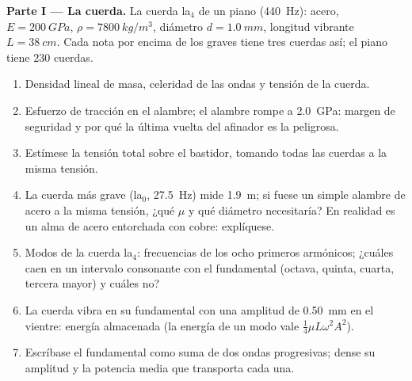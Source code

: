 \begin{problem}
\label{pb:b2:waves-on-strings:1}

\medskip
\noindent\textbf{Parte I --- La cuerda.}
La cuerda la$_4$ de un piano (\qty{440}{Hz}): acero, $E = \qty{200}{GPa}$, $\rho =
\qty{7800}{kg/m^3}$, diámetro $d = \qty{1.0}{mm}$, longitud vibrante $L =
\qty{38}{cm}$. Cada nota por encima de los graves tiene tres cuerdas así; el
piano tiene $230$ cuerdas.
\begin{enumerate}
  \item Densidad lineal de masa, celeridad de las ondas y tensión de la
        cuerda.
  \item Esfuerzo de tracción en el alambre; el alambre rompe a
        \qty{2.0}{GPa}: margen de seguridad y por qué la última vuelta del
        afinador es la peligrosa.
  \item Estímese la tensión total sobre el bastidor, tomando todas las
        cuerdas a la misma tensión.
  \item La cuerda más grave (la$_0$, \qty{27.5}{Hz}) mide \qty{1.9}{m}; si
        fuese un simple alambre de acero a la misma tensión, ¿qué $\mu$ y
        qué diámetro necesitaría? En realidad es un alma de acero
        entorchada con cobre: explíquese.
  \item Modos de la cuerda la$_4$: frecuencias de los ocho primeros
        armónicos; ¿cuáles caen en un intervalo consonante con el
        fundamental (octava, quinta, cuarta, tercera mayor) y cuáles no?
  \item La cuerda vibra en su fundamental con una amplitud de
        \qty{0.50}{mm} en el vientre: energía almacenada (la energía de un
        modo vale $\tfrac14\mu L\omega^2A^2$).
  \item Escríbase el fundamental como suma de dos ondas progresivas; dense
        su amplitud y la potencia media que transporta cada una.
\end{enumerate}


\end{problem}
